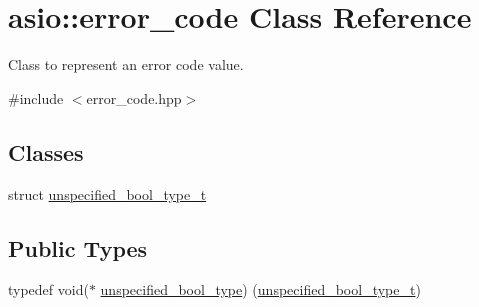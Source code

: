 \hypertarget{classasio_1_1error__code}{}\section{asio\+:\+:error\+\_\+code Class Reference}
\label{classasio_1_1error__code}


Class to represent an error code value.  




{\ttfamily \#include $<$error\+\_\+code.\+hpp$>$}

\subsection*{Classes}
\begin{DoxyCompactItemize}
\item 
struct \hyperlink{structasio_1_1error__code_1_1unspecified__bool__type__t}{unspecified\+\_\+bool\+\_\+type\+\_\+t}
\end{DoxyCompactItemize}
\subsection*{Public Types}
\begin{DoxyCompactItemize}
\item 
typedef void($\ast$ \hyperlink{classasio_1_1error__code_a353c53ec77b09ea93ff7cf52cfaedd12}{unspecified\+\_\+bool\+\_\+type}) (\hyperlink{structasio_1_1error__code_1_1unspecified__bool__type__t}{unspecified\+\_\+bool\+\_\+type\+\_\+t})
\end{DoxyCompactItemize}
